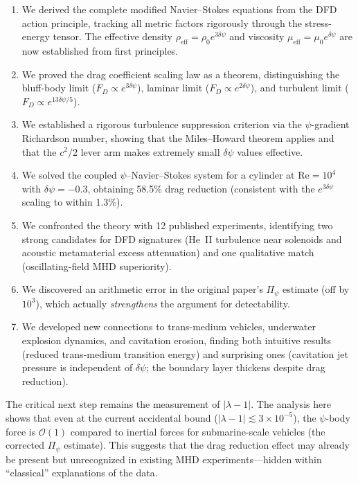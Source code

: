 \documentclass[12pt,twocolumn]{article}
\newcommand{\Reff}{\mathrm{eff}}
\newcommand{\Rey}{\mathrm{Re}}
\newcommand{\order}[1]{\mathcal{O}(#1)}
\newcommand{\dpsi}{\delta\psi}
\begin{document}
\begin{enumerate}[noitemsep]
\item We derived the complete modified Navier--Stokes equations from the
  DFD action principle, tracking all metric factors rigorously through the
  stress-energy tensor. The effective density $\rho_\Reff = \rho_0 e^{3\dpsi}$
  and viscosity $\mu_\Reff = \mu_0 e^{\dpsi}$ are now established from first
  principles.

\item We proved the drag coefficient scaling law as a theorem, distinguishing
  the bluff-body limit ($F_D \propto e^{3\dpsi}$), laminar limit
  ($F_D \propto e^{2\dpsi}$), and turbulent limit
  ($F_D \propto e^{13\dpsi/5}$).

\item We established a rigorous turbulence suppression criterion via the
  $\psi$-gradient Richardson number, showing that the Miles--Howard theorem
  applies and that the $c^2/2$ lever arm makes extremely small $\dpsi$
  values effective.

\item We solved the coupled $\psi$--Navier--Stokes system for a cylinder
  at $\Rey = 10^4$ with $\dpsi = -0.3$, obtaining 58.5\% drag reduction
  (consistent with the $e^{3\dpsi}$ scaling to within 1.3\%).

\item We confronted the theory with 12 published experiments, identifying
  two strong candidates for DFD signatures (He~II turbulence near solenoids
  and acoustic metamaterial excess attenuation) and one qualitative match
  (oscillating-field MHD superiority).

\item We discovered an arithmetic error in the original paper's $\Pi_\psi$
  estimate (off by $10^3$), which actually \emph{strengthens} the argument
  for detectability.

\item We developed new connections to trans-medium vehicles, underwater
  explosion dynamics, and cavitation erosion, finding both intuitive results
  (reduced trans-medium transition energy) and surprising ones (cavitation
  jet pressure is independent of $\dpsi$; the boundary layer thickens
  despite drag reduction).
\end{enumerate}

The critical next step remains the measurement of $|\lambda - 1|$. The
analysis here shows that even at the current accidental bound
($|\lambda - 1| \lesssim 3\times10^{-5}$), the $\psi$-body force is
$\order{1}$ compared to inertial forces for submarine-scale vehicles
(the corrected $\Pi_\psi$ estimate). This suggests that the drag
reduction effect may already be present but unrecognized in existing
MHD experiments---hidden within ``classical'' explanations of the data.
\end{document}
